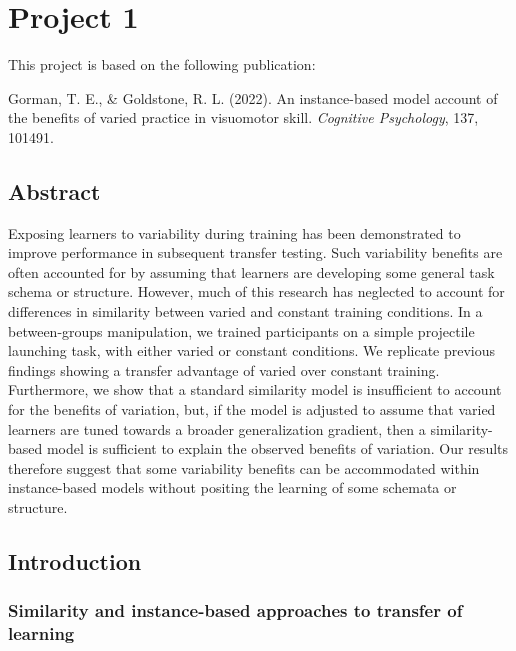 \documentclass[
  11pt,
  letterpaper,
]{article}
\begin{document}
\newpage{}

\section{Project 1}\label{project-1}

This project is based on the following publication:

Gorman, T. E., \& Goldstone, R. L. (2022). An instance-based model
account of the benefits of varied practice in visuomotor skill.
\emph{Cognitive Psychology}, 137, 101491.

\subsection{Abstract}\label{abstract}

Exposing learners to variability during training has been demonstrated
to improve performance in subsequent transfer testing. Such variability
benefits are often accounted for by assuming that learners are
developing some general task schema or structure. However, much of this
research has neglected to account for differences in similarity between
varied and constant training conditions. In a between-groups
manipulation, we trained participants on a simple projectile launching
task, with either varied or constant conditions. We replicate previous
findings showing a transfer advantage of varied over constant training.
Furthermore, we show that a standard similarity model is insufficient to
account for the benefits of variation, but, if the model is adjusted to
assume that varied learners are tuned towards a broader generalization
gradient, then a similarity-based model is sufficient to explain the
observed benefits of variation. Our results therefore suggest that some
variability benefits can be accommodated within instance-based models
without positing the learning of some schemata or structure.

\subsection{Introduction}\label{introduction-1}

\subsubsection{Similarity and instance-based approaches to transfer of
learning}\label{similarity-and-instance-based-approaches-to-transfer-of-learning}
\end{document}
